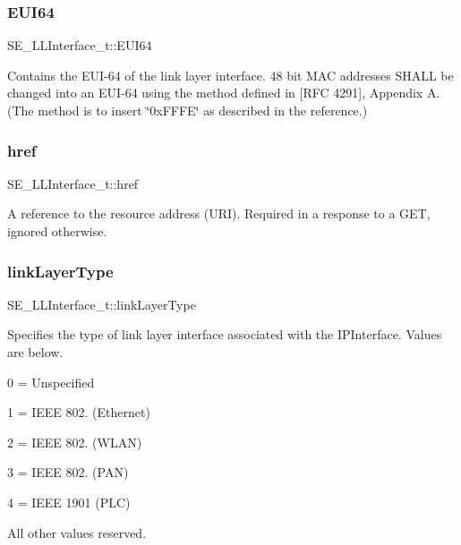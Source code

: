\subsubsection{\texorpdfstring{E\+U\+I64}{EUI64}}
{\footnotesize\ttfamily S\+E\+\_\+\+L\+L\+Interface\+\_\+t\+::\+E\+U\+I64}

Contains the E\+U\+I-\/64 of the link layer interface. 48 bit M\+AC addresses S\+H\+A\+LL be changed into an E\+U\+I-\/64 using the method defined in \mbox{[}R\+FC 4291\mbox{]}, Appendix A. (The method is to insert \char`\"{}0x\+F\+F\+F\+E\char`\"{} as described in the reference.) \mbox{\label{group__LLInterface_ga1215360f15eba876078292b78bee513a}} 
\subsubsection{\texorpdfstring{href}{href}}
{\footnotesize\ttfamily S\+E\+\_\+\+L\+L\+Interface\+\_\+t\+::href}

A reference to the resource address (U\+RI). Required in a response to a G\+ET, ignored otherwise. \mbox{\label{group__LLInterface_ga8ef715e1733f7b500277f889214fc442}} 
\subsubsection{\texorpdfstring{link\+Layer\+Type}{linkLayerType}}
{\footnotesize\ttfamily S\+E\+\_\+\+L\+L\+Interface\+\_\+t\+::link\+Layer\+Type}

Specifies the type of link layer interface associated with the I\+P\+Interface. Values are below.

0 = Unspecified

1 = I\+E\+EE 802. (Ethernet)

2 = I\+E\+EE 802. (W\+L\+AN)

3 = I\+E\+EE 802. (P\+AN)

4 = I\+E\+EE 1901 (P\+LC)

All other values reserved. \mbox{\label{group__LLInterface_ga55320632c0236c217127525559c57b8b}} 
